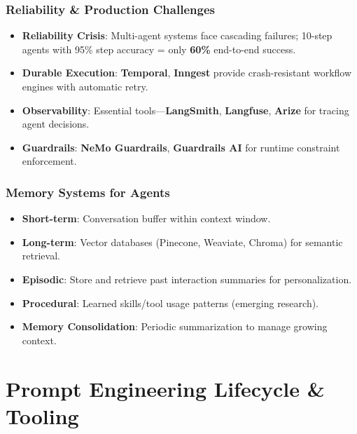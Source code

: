\documentclass{beamer}
\begin{document}
\begin{frame}
    \frametitle{Reliability \& Production Challenges}
    \begin{itemize}
        \item \textbf{Reliability Crisis}: Multi-agent systems face cascading failures; 10-step agents with 95\% step accuracy = only \textbf{60\%} end-to-end success.
        \item \textbf{Durable Execution}: \textbf{Temporal}, \textbf{Inngest} provide crash-resistant workflow engines with automatic retry.
        \item \textbf{Observability}: Essential tools---\textbf{LangSmith}, \textbf{Langfuse}, \textbf{Arize} for tracing agent decisions.
        \item \textbf{Guardrails}: \textbf{NeMo Guardrails}, \textbf{Guardrails AI} for runtime constraint enforcement.
    \end{itemize}
\end{frame}

\begin{frame}
    \frametitle{Memory Systems for Agents}
    \begin{itemize}
        \item \textbf{Short-term}: Conversation buffer within context window.
        \item \textbf{Long-term}: Vector databases (Pinecone, Weaviate, Chroma) for semantic retrieval.
        \item \textbf{Episodic}: Store and retrieve past interaction summaries for personalization.
        \item \textbf{Procedural}: Learned skills/tool usage patterns (emerging research).
        \item \textbf{Memory Consolidation}: Periodic summarization to manage growing context.
    \end{itemize}
\end{frame}

\section{Prompt Engineering Lifecycle \& Tooling}
\end{document}
